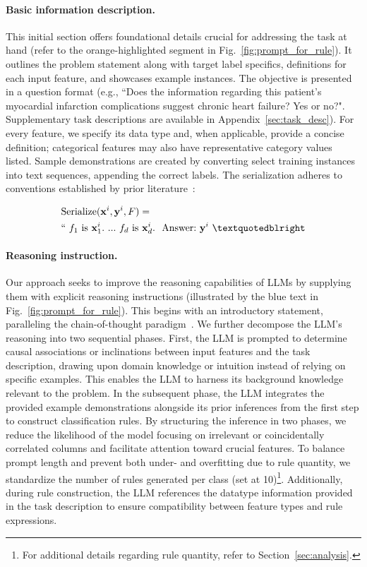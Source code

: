 \vspace*{-0.12in}
\paragraph{Basic information description.} This initial section offers foundational details crucial for addressing the task at hand (refer to the orange-highlighted segment in Fig.~\ref{fig:prompt_for_rule}). It outlines the problem statement along with target label specifics, definitions for each input feature, and showcases example instances. The objective is presented in a question format (e.g., ``Does the information regarding this patient's myocardial infarction complications suggest chronic heart failure? Yes or no?". Supplementary task descriptions are available in Appendix~\ref{sec:task_desc}). For every feature, we specify its data type and, when applicable, provide a concise definition; categorical features may also have representative category values listed. Sample demonstrations are created by converting select training instances into text sequences, appending the correct labels. The serialization adheres to conventions established by prior literature~\cite{dinh2022lift,hegselmann2023tabllm}:

\begin{align}
&\text{Serialize}(\mathbf{x}^i,\mathbf{y}^i, F) = \nonumber \\ 
&``\ f_1\ \text{is}\ \mathbf{x}^i_1.\ ... \ f_d\  \text{is}\  \mathbf{x}^i_d.\ \ \text{Answer:}\  \mathbf{y}^i\ ”
\end{align}

\vspace*{-0.12in}
\paragraph{Reasoning instruction.} Our approach seeks to improve the reasoning capabilities of LLMs by supplying them with explicit reasoning instructions (illustrated by the blue text in Fig.~\ref{fig:prompt_for_rule}). This begins with an introductory statement, paralleling the chain-of-thought paradigm~\cite{wei2022chain}. We further decompose the LLM's reasoning into two sequential phases. First, the LLM is prompted to determine causal associations or inclinations between input features and the task description, drawing upon domain knowledge or intuition instead of relying on specific examples. This enables the LLM to harness its background knowledge relevant to the problem. In the subsequent phase, the LLM integrates the provided example demonstrations alongside its prior inferences from the first step to construct classification rules. By structuring the inference in two phases, we reduce the likelihood of the model focusing on irrelevant or coincidentally correlated columns and facilitate attention toward crucial features. To balance prompt length and prevent both under- and overfitting due to rule quantity, we standardize the number of rules generated per class (set at 10)\footnote{For additional details regarding rule quantity, refer to Section~\ref{sec:analysis}.}. Additionally, during rule construction, the LLM references the datatype information provided in the task description to ensure compatibility between feature types and rule expressions.

